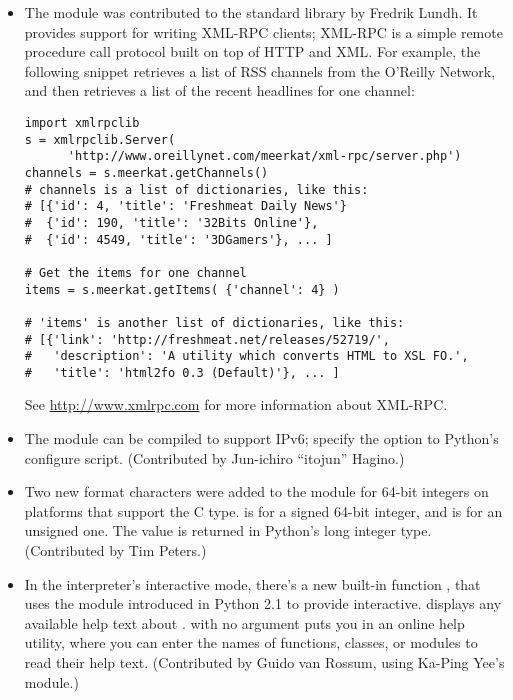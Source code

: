 \documentclass{howto}
\begin{document}
\begin{itemize}

  \item The  module was contributed to the standard
library by Fredrik Lundh.  It provides support for writing XML-RPC
clients; XML-RPC is a simple remote procedure call protocol built on
top of HTTP and XML. For example, the following snippet retrieves a
list of RSS channels from the O'Reilly Network, and then retrieves a
list of the recent headlines for one channel:

\begin{verbatim}
import xmlrpclib
s = xmlrpclib.Server(
      'http://www.oreillynet.com/meerkat/xml-rpc/server.php')
channels = s.meerkat.getChannels()
# channels is a list of dictionaries, like this:
# [{'id': 4, 'title': 'Freshmeat Daily News'}
#  {'id': 190, 'title': '32Bits Online'},
#  {'id': 4549, 'title': '3DGamers'}, ... ]

# Get the items for one channel
items = s.meerkat.getItems( {'channel': 4} )

# 'items' is another list of dictionaries, like this:
# [{'link': 'http://freshmeat.net/releases/52719/', 
#   'description': 'A utility which converts HTML to XSL FO.', 
#   'title': 'html2fo 0.3 (Default)'}, ... ]
\end{verbatim}

See \url{http://www.xmlrpc.com} for more information about XML-RPC.

  \item The  module can be compiled to support IPv6;
  specify the  option to Python's configure
  script.  (Contributed by Jun-ichiro ``itojun'' Hagino.)

  \item Two new format characters were added to the 
  module for 64-bit integers on platforms that support the C
   type.   is for a signed 64-bit integer,
  and  is for an unsigned one.  The value is returned in
  Python's long integer type.  (Contributed by Tim Peters.)

  \item In the interpreter's interactive mode, there's a new built-in
  function , that uses the  module
  introduced in Python 2.1 to provide interactive.
   displays any available help text about
  .   with no argument puts you in an online
  help utility, where you can enter the names of functions, classes,
  or modules to read their help text.
  (Contributed by Guido van Rossum, using Ka-Ping Yee's  module.)


\end{itemize}
\end{document}
